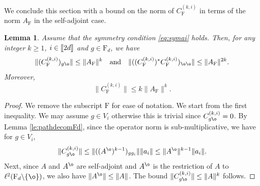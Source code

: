 \documentclass[11pt]{article}
\renewcommand{\star}{{\mathrm{F}}}
\newtheorem{lemma}{Lemma}[section]
\newcommand{\dF}{\mathrm{F}}
\newcommand{\AND}{\quad \mathrm{and} \quad}
\newcommand{\1}{1\!\!{\sf I}}
\newcommand{\INT}[1]{{{\left[\hspace{-1.4pt}\left[#1\right]\hspace{-1.4pt}\right]}}}
\begin{document}
We conclude this section with a bound on the norm of $C_\star^{(k,i)}$ in terms of the norm $ A_\star$ in the self-adjoint case.

\begin{lemma}\label{le:normCk}
Assume that the symmetry condition \eqref{eq:symai} holds. Then, for any integer $k \geq 1$, $i \in \INT{2d}$ and $g \in \dF_d$, we have
$$
\| (C_\star ^{(k,i)})_{g \o} \| \leq \|  A_\star\|^{k}\AND  \| ((C_\star ^{(k,i)})^* C_\star^{(k,i)})_{\o \o} \|  \leq \|A_\star\|^{2k}.
$$
Moreover,
$$
\| C_\star ^{(k,i)} \| \leq k \|  A_\star\|^{k}.
$$
\end{lemma}
\begin{proof}
We remove the subscript $\star$ for ease of notation. We start from the first inequality. We may assume $g \in V_i$ otherwise this is trivial since $C ^{(k,i)}_{g \o}  = 0$. By Lemma \ref{le:pathdecomFd}, since the operator norm is sub-multiplicative, we have for $g \in V_i$,  
$$
\| C  ^{(k,i)}_{g \o} \| \leq \| ((A^{\o})^{k-1} )_{g g_i} \| \| a_i \| \leq \| A^{\o} \|^{k-1} \| a_i \| . 
$$
Next, since $A$ and $A^{\o}$ are self-adjoint and $A^{\o}$ is the restriction of $A$ to $\ell^2(\dF_d \backslash \{\o\})$, we also have $\| A^{\o}\| \leq \| A\|$. The bound $\| C ^{(k,i)}_{g \o} \| \leq \|  A\|^{k}$ follows. 


\end{proof}
\end{document}
